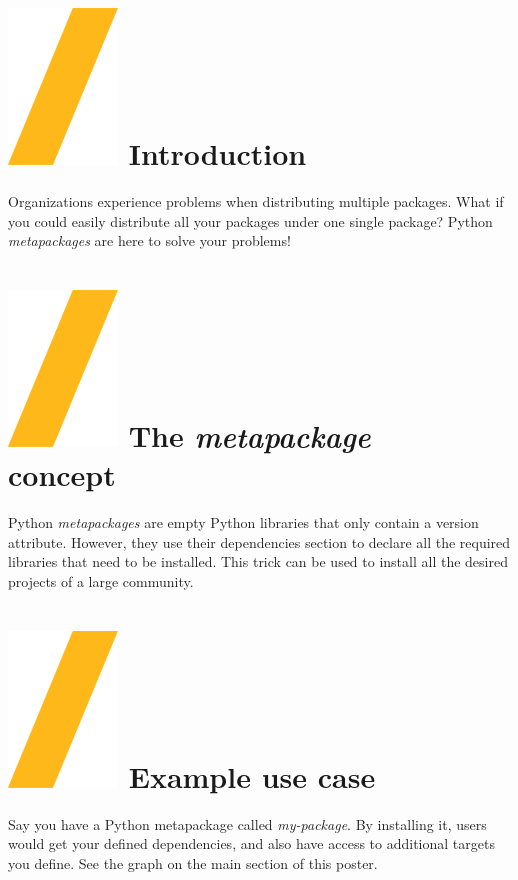 \documentclass[a0paper,fleqn]{src/betterposter}
\begin{document}
{\section{\includegraphics[height=\fontcharht\font`\S]{img/general/slash.png} Introduction}
Organizations experience problems when distributing multiple packages. What if you could easily distribute
all your packages under one single package? Python \textit{metapackages} are here to solve your problems!

\section{\includegraphics[height=\fontcharht\font`\S]{img/general/slash.png} The \textit{metapackage}\\concept}
Python \textit{metapackages} are empty Python libraries that only contain a version attribute.
However, they use their dependencies section to declare all the required libraries that need
to be installed. This trick can be used to install all the desired projects of a large community.

\section{\includegraphics[height=\fontcharht\font`\S]{img/general/slash.png} Example use case}
Say you have a Python metapackage called \textit{my-package}. By installing it, users would get your
defined dependencies, and also have access to additional targets you define. See the graph on the main
section of this poster.

}
\end{document}
